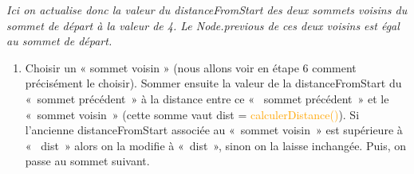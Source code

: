\documentclass[,french]{article}
\providecommand{\tightlist}{%
  \setlength{\itemsep}{0pt}\setlength{\parskip}{0pt}}
\begin{document}
\begin{center}
\end{center}
\begin{adjustwidth}{50pt}{50pt}
\begin{center}
\emph{Ici on actualise donc la valeur du distanceFromStart des deux sommets voisins du sommet de départ à la valeur de 4. Le Node.previous de ces deux voisins est égal au sommet de départ.}

\end{center}

\end{adjustwidth}

\begin{enumerate}
\def\labelenumi{\arabic{enumi}.}
\setcounter{enumi}{3}
\tightlist
\item
  Choisir un « sommet voisin » (nous allons voir en étape 6 comment
  précisément le choisir). Sommer ensuite la valeur de la
  distanceFromStart du «~sommet précédent~» à la distance entre ce «~
  sommet précédent~» et le «~sommet voisin~» (cette somme vaut dist =
  \textcolor{orange}{calculerDistance()}). Si l'ancienne
  distanceFromStart associée au «~sommet voisin~» est supérieure à «~
  dist~» alors on la modifie à «~dist~», sinon on la laisse inchangée.
  Puis, on passe au sommet suivant.
\end{enumerate}
\end{document}
